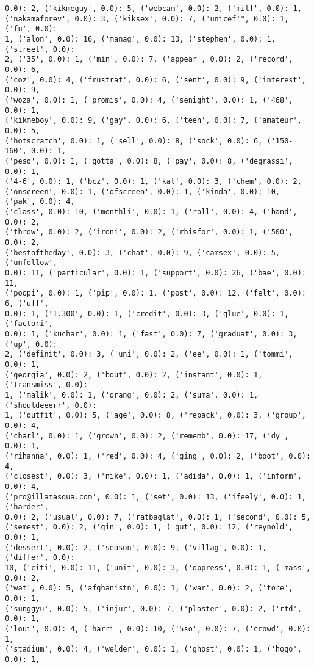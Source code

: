 \documentclass[11pt]{article}
\begin{document}
\begin{Verbatim}[commandchars=\\\{\}]
0.0): 2, ('kikmeguy', 0.0): 5, ('webcam', 0.0): 2, ('milf', 0.0): 1,
('nakamaforev', 0.0): 3, ('kiksex', 0.0): 7, ("unicef'", 0.0): 1, ('fu', 0.0):
1, ('alon', 0.0): 16, ('manag', 0.0): 13, ('stephen', 0.0): 1, ('street', 0.0):
2, ('35', 0.0): 1, ('min', 0.0): 7, ('appear', 0.0): 2, ('record', 0.0): 6,
('coz', 0.0): 4, ('frustrat', 0.0): 6, ('sent', 0.0): 9, ('interest', 0.0): 9,
('woza', 0.0): 1, ('promis', 0.0): 4, ('senight', 0.0): 1, ('468', 0.0): 1,
('kikmeboy', 0.0): 9, ('gay', 0.0): 6, ('teen', 0.0): 7, ('amateur', 0.0): 5,
('hotscratch', 0.0): 1, ('sell', 0.0): 8, ('sock', 0.0): 6, ('150-160', 0.0): 1,
('peso', 0.0): 1, ('gotta', 0.0): 8, ('pay', 0.0): 8, ('degrassi', 0.0): 1,
('4-6', 0.0): 1, ('bcz', 0.0): 1, ('kat', 0.0): 3, ('chem', 0.0): 2,
('onscreen', 0.0): 1, ('ofscreen', 0.0): 1, ('kinda', 0.0): 10, ('pak', 0.0): 4,
('class', 0.0): 10, ('monthli', 0.0): 1, ('roll', 0.0): 4, ('band', 0.0): 2,
('throw', 0.0): 2, ('ironi', 0.0): 2, ('rhisfor', 0.0): 1, ('500', 0.0): 2,
('bestoftheday', 0.0): 3, ('chat', 0.0): 9, ('camsex', 0.0): 5, ('unfollow',
0.0): 11, ('particular', 0.0): 1, ('support', 0.0): 26, ('bae', 0.0): 11,
('poopi', 0.0): 1, ('pip', 0.0): 1, ('post', 0.0): 12, ('felt', 0.0): 6, ('uff',
0.0): 1, ('1.300', 0.0): 1, ('credit', 0.0): 3, ('glue', 0.0): 1, ('factori',
0.0): 1, ('kuchar', 0.0): 1, ('fast', 0.0): 7, ('graduat', 0.0): 3, ('up', 0.0):
2, ('definit', 0.0): 3, ('uni', 0.0): 2, ('ee', 0.0): 1, ('tommi', 0.0): 1,
('georgia', 0.0): 2, ('bout', 0.0): 2, ('instant', 0.0): 1, ('transmiss', 0.0):
1, ('malik', 0.0): 1, ('orang', 0.0): 2, ('suma', 0.0): 1, ('shouldeeerr', 0.0):
1, ('outfit', 0.0): 5, ('age', 0.0): 8, ('repack', 0.0): 3, ('group', 0.0): 4,
('charl', 0.0): 1, ('grown', 0.0): 2, ('rememb', 0.0): 17, ('dy', 0.0): 1,
('rihanna', 0.0): 1, ('red', 0.0): 4, ('ging', 0.0): 2, ('boot', 0.0): 4,
('closest', 0.0): 3, ('nike', 0.0): 1, ('adida', 0.0): 1, ('inform', 0.0): 4,
('pro@illamasqua.com', 0.0): 1, ('set', 0.0): 13, ('ifeely', 0.0): 1, ('harder',
0.0): 2, ('usual', 0.0): 7, ('ratbaglat', 0.0): 1, ('second', 0.0): 5,
('semest', 0.0): 2, ('gin', 0.0): 1, ('gut', 0.0): 12, ('reynold', 0.0): 1,
('dessert', 0.0): 2, ('season', 0.0): 9, ('villag', 0.0): 1, ('differ', 0.0):
10, ('citi', 0.0): 11, ('unit', 0.0): 3, ('oppress', 0.0): 1, ('mass', 0.0): 2,
('wat', 0.0): 5, ('afghanistn', 0.0): 1, ('war', 0.0): 2, ('tore', 0.0): 1,
('sunggyu', 0.0): 5, ('injur', 0.0): 7, ('plaster', 0.0): 2, ('rtd', 0.0): 1,
('loui', 0.0): 4, ('harri', 0.0): 10, ('5so', 0.0): 7, ('crowd', 0.0): 1,
('stadium', 0.0): 4, ('welder', 0.0): 1, ('ghost', 0.0): 1, ('hogo', 0.0): 1,

\end{Verbatim}
\end{document}

